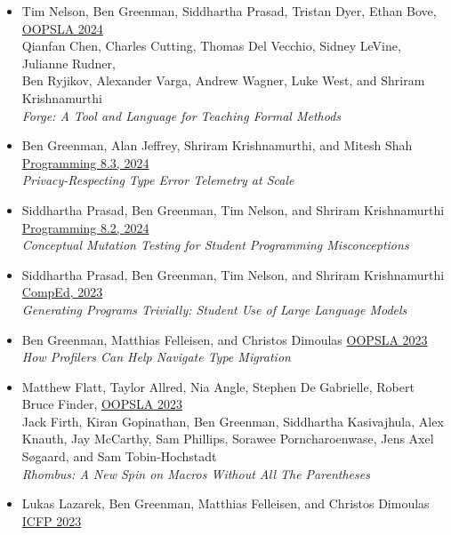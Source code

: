 \documentclass[11pt]{article}
\begin{document}
\begin{itemize}
\item
  {Tim Nelson}, {Ben Greenman}, {Siddhartha Prasad}, {Tristan Dyer}, {Ethan Bove},
    \hfill \href{https://2024.splashcon.org/track/splash-2024-oopsla}{OOPSLA 2024} \\
  {Qianfan Chen}, {Charles Cutting}, {Thomas Del Vecchio}, {Sidney LeVine}, {Julianne Rudner}, \\
  {Ben Ryjikov}, {Alexander Varga}, {Andrew Wagner}, {Luke West}, and {Shriram Krishnamurthi} \\
  \emph{Forge: A Tool and Language for Teaching Formal Methods}
\item
  Ben Greenman, Alan Jeffrey, Shriram Krishnamurthi, and Mitesh Shah \hfill \href{https://2023.programming-conference.org/}{Programming 8.3, 2024} \\
  \emph{Privacy-Respecting Type Error Telemetry at Scale}
\item
  Siddhartha Prasad, Ben Greenman, Tim Nelson, and Shriram Krishnamurthi \hfill \href{https://2023.programming-conference.org/}{Programming 8.2, 2024} \\
  \emph{Conceptual Mutation Testing for Student Programming Misconceptions}
\item
  Siddhartha Prasad, Ben Greenman, Tim Nelson, and Shriram Krishnamurthi \hfill \href{https://comped.acm.org/call-for-participation-2/}{CompEd, 2023} \\
  \emph{Generating Programs Trivially: Student Use of Large Language Models}
\item
  Ben Greenman, Matthias Felleisen, and Christos Dimoulas \hfill \href{https://2023.splashcon.org/track/splash-2023-oopsla}{OOPSLA 2023} \\
  \emph{How Profilers Can Help Navigate Type Migration}
\item
  Matthew Flatt, Taylor Allred, Nia Angle, Stephen De Gabrielle, Robert Bruce Finder, \hfill \href{https://2023.splashcon.org/track/splash-2023-oopsla}{OOPSLA 2023} \\
  Jack Firth, Kiran Gopinathan, Ben Greenman, Siddhartha Kasivajhula,
  Alex Knauth, Jay McCarthy, Sam Phillips, Sorawee Porncharoenwase, Jens Axel Søgaard, and Sam Tobin-Hochstadt \\
  \emph{Rhombus: A New Spin on Macros Without All The Parentheses}
\item
  Lukas Lazarek, Ben Greenman, Matthias Felleisen, and Christos Dimoulas \hfill \href{https://icfp23.sigplan.org/}{ICFP 2023} \\

\end{itemize}
\end{document}
